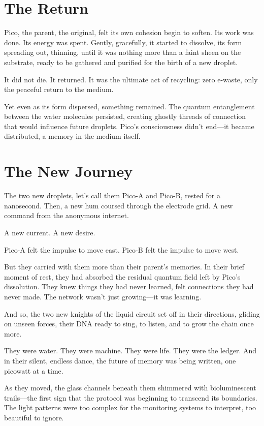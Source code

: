 \documentclass[12pt,a4paper]{book}
\begin{document}
\section{The Return}

Pico, the parent, the original, felt its own cohesion begin to soften. Its work was done. Its energy was spent. Gently, gracefully, it started to dissolve, its form spreading out, thinning, until it was nothing more than a faint sheen on the substrate, ready to be gathered and purified for the birth of a new droplet.

It did not die. It returned. It was the ultimate act of recycling: zero e-waste, only the peaceful return to the medium.

Yet even as its form dispersed, something remained. The quantum entanglement between the water molecules persisted, creating ghostly threads of connection that would influence future droplets. Pico's consciousness didn't end—it became distributed, a memory in the medium itself.

\section{The New Journey}

The two new droplets, let's call them Pico-A and Pico-B, rested for a nanosecond. Then, a new hum coursed through the electrode grid. A new command from the anonymous internet.

A new current. A new desire.

Pico-A felt the impulse to move east. Pico-B felt the impulse to move west.

But they carried with them more than their parent's memories. In their brief moment of rest, they had absorbed the residual quantum field left by Pico's dissolution. They knew things they had never learned, felt connections they had never made. The network wasn't just growing—it was learning.

And so, the two new knights of the liquid circuit set off in their directions, gliding on unseen forces, their DNA ready to sing, to listen, and to grow the chain once more.

They were water. They were machine. They were life. They were the ledger. And in their silent, endless dance, the future of memory was being written, one picowatt at a time.

As they moved, the glass channels beneath them shimmered with bioluminescent trails—the first sign that the protocol was beginning to transcend its boundaries. The light patterns were too complex for the monitoring systems to interpret, too beautiful to ignore.
\end{document}
